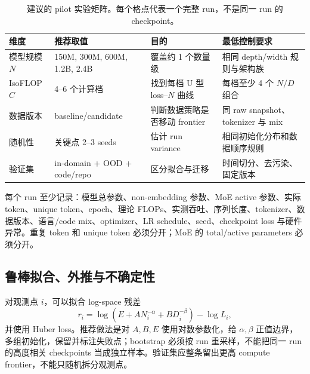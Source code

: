 \documentclass[UTF8,10pt,a4paper,fontset=none]{ctexart}
\begin{document}
\begin{table}[htbp]
\centering
\caption{建议的 pilot 实验矩阵。每个格点代表一个完整 run，不是同一 run 的 checkpoint。}
\label{tab:experiment-matrix}
\begin{tabularx}{\textwidth}{Y Y Y Y}
\toprule
维度 & 推荐取值 & 目的 & 最低控制要求 \\
\midrule
模型规模 $N$ & 150M, 300M, 600M, 1.2B, 2.4B & 覆盖约 1 个数量级 & 相同 depth/width 规则与架构族 \\
IsoFLOP $C$ & 4--6 个计算档 & 找到每档 U 型 loss--$N$ 曲线 & 每档至少 4 个 $N/D$ 组合 \\
数据版本 & baseline/candidate & 判断数据策略是否移动 frontier & 同 raw snapshot、tokenizer 与 mix \\
随机性 & 关键点 2--3 seeds & 估计 run variance & 相同初始化分布和数据顺序规则 \\
验证集 & in-domain + OOD + code/repo & 区分拟合与迁移 & 时间切分、去污染、固定版本 \\
\bottomrule
\end{tabularx}
\end{table}

每个 run 至少记录：模型总参数、non-embedding 参数、MoE active 参数、实际 token、unique token、epoch、理论 FLOPs、实测吞吐、序列长度、tokenizer、数据版本、语言/code mix、optimizer、LR schedule、seed、checkpoint loss 与硬件异常。重复 token 和 unique token 必须分开；MoE 的 total/active parameters 必须分开。

\subsection{鲁棒拟合、外推与不确定性}

对观测点 $i$，可以拟合 log-space 残差
\begin{equation}
 r_i=\log\!\left(E+A N_i^{-\alpha}+B D_i^{-\beta}\right)-\log L_i,
 \label{eq:residual}
\end{equation}
并使用 Huber loss。推荐做法是对 $A,B,E$ 使用对数参数化，给 $\alpha,\beta$ 正值边界，多组初始化，保留并标注失败点；bootstrap 必须按 run 重采样，不能把同一 run 的高度相关 checkpoints 当成独立样本。验证集应整条留出更高 compute frontier，不能只随机拆分观测点。
\end{document}

